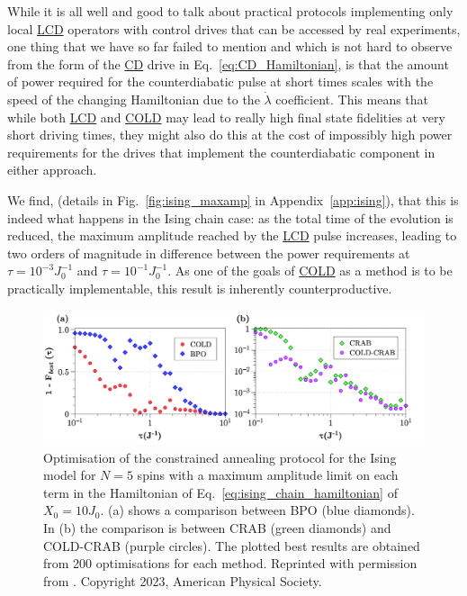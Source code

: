 \documentclass[a4paper,oneside,11pt]{book}
\newcommand{\dotlambda}{\dot{\lambda}}
\newcommand{\acrref}[1]{\hyperref[acr:#1]{#1}}
\begin{document}
While it is all well and good to talk about practical protocols implementing only local \acrref{LCD} operators with control drives that can be accessed by real experiments, one thing that we have so far failed to mention and which is not hard to observe from the form of the \acrref{CD} drive in Eq.~\ref{eq:CD_Hamiltonian}, is that the amount of power required for the counterdiabatic pulse at short times scales with the speed of the changing Hamiltonian due to the $\dotlambda$ coefficient. This means that while both \acrref{LCD} and \acrref{COLD} may lead to really high final state fidelities at very short driving times, they might also do this at the cost of impossibly high power requirements for the drives that implement the counterdiabatic component in either approach.

We find, (details in Fig.~\ref{fig:ising_maxamp} in Appendix~\ref{app:ising}), that this is indeed what happens in the Ising chain case: as the total time of the evolution is reduced, the maximum amplitude reached by the \acrref{LCD} pulse increases, leading to two orders of magnitude in difference between the power requirements at $\tau = 10^{-3}J_0^{-1}$ and $\tau = 10^{-1}J_0^{-1}$. As one of the goals of \acrref{COLD} as a method is to be practically implementable, this result is inherently counterproductive.

\begin{figure}[t]
    \centering
    \includegraphics[width=\linewidth]{images/IsingcConstrained.png} \caption[Applying COLD and COLD-CRAB to the Ising chain for 5 spins with constrained driving amplitudes.]{Optimisation of the constrained annealing protocol for the Ising model for $N=5$ spins with a maximum amplitude limit on each term in the Hamiltonian of Eq.~\eqref{eq:ising_chain_hamiltonian} of $X_0 = 10J_0$. (a) shows a comparison between BPO (blue diamonds). In (b) the comparison is between CRAB (green diamonds) and COLD-CRAB (purple circles). The plotted best results are obtained from 200 optimisations for each method. Reprinted with permission from \cite{cepaite_counterdiabatic_2023}. Copyright 2023, American Physical Society.}\label{fig:ising_constrained}
\end{figure}
\end{document}
